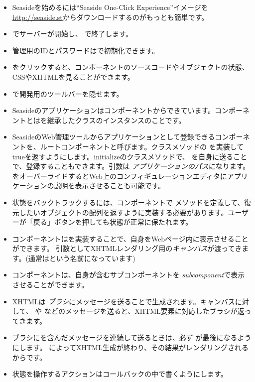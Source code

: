 \documentclass[a4paper,10pt,twoside]{book}
\begin{document}
\begin{itemize}
  \item Seasideを始めるには``Seaside One-Click Experience''イメージを \url{http://seaside.st}からダウンロードするのがもっとも簡単です。
  \item {} でサーバーが開始し、 で終了します。
  \item 管理用のIDとパスワードはで初期化できます。
  \item {} をクリックすると、コンポーネントのソースコードやオブジェクトの状態、CSSやXHTMLを見ることができます。
  \item {} で開発用のツールバーを隠せます。
  \item Seasideのアプリケーションはコンポーネントからできています。コンポーネントとはを継承したクラスのインスタンスのことです。
  \item SeasideのWeb管理ツールからアプリケーションとして登録できるコンポーネントを、ルートコンポーネントと呼びます。クラスメソッドの  を実装してtrueを返すようにします。initializeのクラスメソッドで、  を自身に送ることで、登録することもできます。引数は \emph{アプリケーションのパス}になります。
     をオーバーライドするとWeb上のコンフィギュレーションエディタにアプリケーションの説明を表示させることも可能です。
  \item 状態をバックトラックするには、コンポーネントで  メソッドを定義して、復元したいオブジェクトの配列を返すように実装する必要があります。ユーザーが「戻る」ボタンを押しても状態が正常に保たれます。
  \item コンポーネントはを実装することで、自身をWebページ内に表示させることができます。
    引数としてXHTMLレンダリング用の\emph{キャンバス}が渡ってきます。(通常はという名前になっています)
  \item コンポーネントは、自身が含むサブコンポーネントを  \emph{subcomponent}で表示させることができます。
  \item XHTMLは \emph{ブラシ}にメッセージを送ることで生成されます。キャンバスに対して、  や などのメッセージを送ると、XHTML要素に対応したブラシが返ってきます。
  \item ブラシにを含んだメッセージを連続して送るときは、必ず が最後になるようにします。
    によってXHTML生成が終わり、その結果がレンダリングされるからです。
  \item 状態を操作するアクションはコールバックの中で書くようにします。

\end{itemize}
\end{document}
